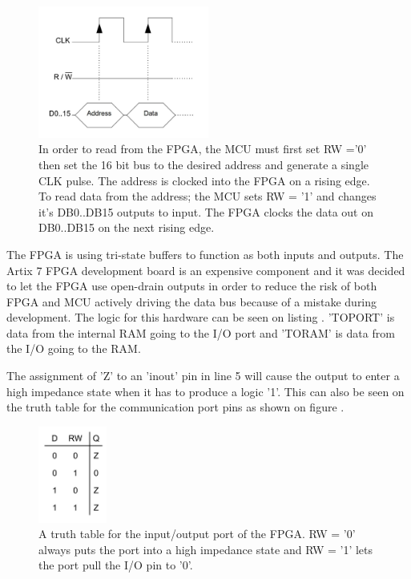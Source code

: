 \begin{figure}[H]
    \centering
    \includegraphics[clip, trim=0 50 0 0, width=0.5\textwidth]{Sections/7_SystemDesign/Figures/7_2_1_CommWrite.pdf}
    \caption{In order to read from the FPGA, the MCU must first set RW ='0' then set the 16 bit bus to the desired address and generate a single CLK pulse. The address is clocked into the FPGA on a rising edge. To read data from the address; the MCU sets RW = '1' and changes it's DB0..DB15 outputs to input. The FPGA clocks the data out on DB0..DB15 on the next rising edge.}
    \label{fig_7_2_1_CommRead}
\end{figure}

The FPGA is using tri-state buffers to function as both inputs and outputs. The Artix 7 FPGA development board is an expensive component and it was decided to let the FPGA use open-drain outputs in order to reduce the risk of both FPGA and MCU actively driving the data bus because of a mistake during development. The logic for this hardware can be seen on listing . 'TOPORT' is data from the internal RAM going to the I/O port and 'TORAM' is data from the I/O going to the RAM.



The assignment of 'Z' to an 'inout' pin in line 5 will cause the output to enter a high impedance state when it has to produce a logic '1'. This can also be seen on the truth table for the communication port pins as shown on figure .

\begin{figure}[H]
    \centering
    \includegraphics[clip, trim=0 50 0 0, width=0.2\textwidth]{Sections/7_SystemDesign/Figures/7_2_1_IOPortLogic.pdf}
    \caption{A truth table for the input/output port of the FPGA. RW = '0' always puts the port into a high impedance state and RW = '1' lets the port pull the I/O pin to '0'.}
    \label{fig_7_2_1_TruthTable}
\end{figure}

